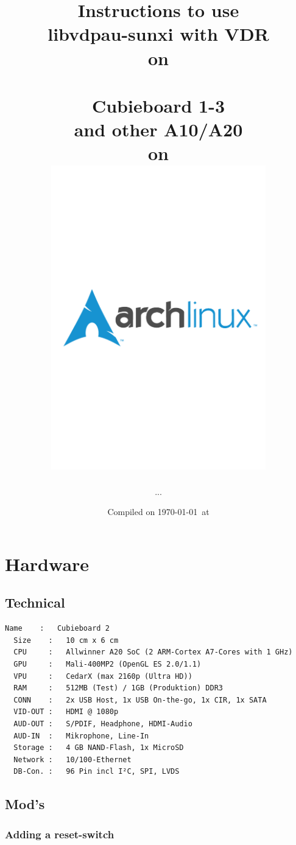 \documentclass[11pt, a4paper,ngerman]{article}
\title{ 
Instructions to use \\ libvdpau-sunxi with VDR \\ on \\ \cubiebig \\ Cubieboard 1-3 \\ and other A10/A20 \\ on \\ 
\vspace{-5cm}
\includegraphics[width=0.7\textwidth]{pictures/archlinux}
\vspace{-5cm}
}
\author{ ... }
\date{Compiled on \today\ at \currenttime}
\begin{document}
\maketitle
\newpage %
\tableofcontents 
\newpage %


\section{Hardware}
\subsection{Technical}
\begin{Verbatim}[frame=lines,
       framerule=0.2mm,framesep=3mm,
       rulecolor=\color{monoorange},
       fillcolor=\color{monogreen},
       label=\cubiebig,labelposition=topline]
  Name    :   Cubieboard 2
  Size    :   10 cm x 6 cm
  CPU     :   Allwinner A20 SoC (2 ARM-Cortex A7-Cores with 1 GHz)
  GPU     :   Mali-400MP2 (OpenGL ES 2.0/1.1)
  VPU     :   CedarX (max 2160p (Ultra HD))
  RAM     :   512MB (Test) / 1GB (Produktion) DDR3
  CONN    :   2x USB Host, 1x USB On-the-go, 1x CIR, 1x SATA
  VID-OUT :   HDMI @ 1080p
  AUD-OUT :   S/PDIF, Headphone, HDMI-Audio
  AUD-IN  :   Mikrophone, Line-In
  Storage :   4 GB NAND-Flash, 1x MicroSD
  Network :   10/100-Ethernet
  DB-Con. :   96 Pin incl I²C, SPI, LVDS
\end{Verbatim}

\subsection{Mod's}

\color{red}
\color{black}

\subsubsection{Adding a reset-switch}
\end{document}
